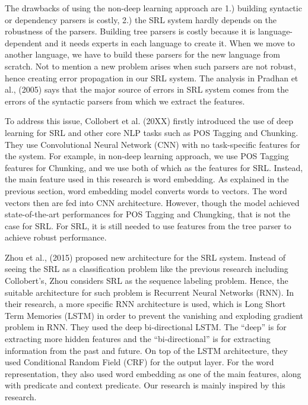 The drawbacks of using the non-deep learning approach are 1.) building syntactic or dependency parsers is costly, 2.) the SRL system hardly depends on the robustness of the parsers. Building tree parsers is costly because it is language-dependent and it needs experts in each language to create it. When we move to another language, we have to build these parsers for the new language from scratch. Not to mention a new problem arises when such parsers are not robust, hence creating error propagation in our SRL system. The analysis in Pradhan et al., (2005) says that the major source of errors in SRL system comes from the errors of the syntactic parsers from which we extract the features.

To address this issue, Collobert et al. (20XX) firstly introduced the use of deep learning for SRL and other core NLP tasks such as POS Tagging and Chunking. They use Convolutional Neural Network (CNN) with no task-specific features for the system. For example, in non-deep learning approach, we use POS Tagging features for Chunking, and we use both of which as the features for SRL. Instead, the main feature used in this research is word embedding. As explained in the previous section, word embedding model converts words to vectors. The word vectors then are fed into CNN architecture. However, though the model achieved state-of-the-art performances for POS Tagging and Chungking, that is not the case for SRL. For SRL, it is still needed to use features from the tree parser to achieve robust performance.

Zhou et al., (2015) proposed new architecture for the SRL system. Instead of seeing the SRL as a classification problem like the previous research including Collobert’s, Zhou considers SRL as the sequence labeling problem. Hence, the suitable architecture for such problem is Recurrent Neural Networks (RNN). In their research, a more specific RNN architecture is used, which is Long Short Term Memories (LSTM) in order to prevent the vanishing and exploding gradient problem in RNN. They used the deep bi-directional LSTM. The “deep” is for extracting more hidden features and the “bi-directional” is for extracting information from the past and future. On top of the LSTM architecture, they used Conditional Random Field (CRF) for the output layer. For the word representation, they also used word embedding as one of the main features, along with predicate and context predicate. Our research is mainly inspired by this research.

